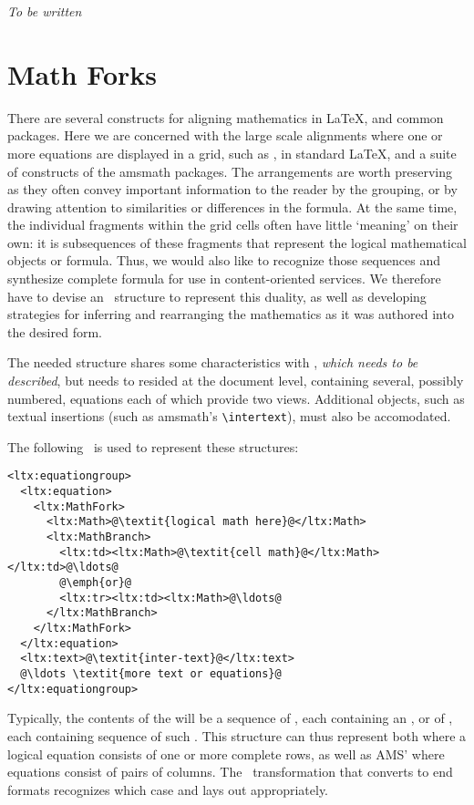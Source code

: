 \documentclass{book}
\begin{document}
\emph{To be written}

\section{Math Forks}\label{mathfork}
There are several constructs for aligning mathematics in \LaTeX, and common
packages. Here we are concerned with the large scale alignments where
one or more equations are displayed in a grid,
such as , in standard \LaTeX,
and a suite of constructs of the amsmath packages.
The arrangements are worth preserving as they often convey important information to the
reader by the grouping, or by drawing attention to similarities or differences
in the formula.   At the same time, the individual fragments within the grid
cells often have little `meaning' on their own:
it is subsequences of these fragments that represent the logical
mathematical objects or formula.  Thus, we would also like to
recognize those sequences and synthesize complete formula
for use in content-oriented services.
We therefore have to devise an \XML\ structure to represent this duality,
as well as developing strategies for inferring and rearranging
the mathematics as it was authored into the desired form.

The needed structure shares some characteristics with ,
\emph{which needs to be described},
but needs to resided at the document level, containing several,
possibly numbered, equations each of which provide two views.
Additional objects, such as textual insertions (such as amsmath's \verb|\intertext|),
must also be accomodated.

The following \XML\ is used to represent these structures:
\begin{lstlisting}[style=xml]
<ltx:equationgroup>
  <ltx:equation>
    <ltx:MathFork>
      <ltx:Math>@\textit{logical math here}@</ltx:Math>
      <ltx:MathBranch>
        <ltx:td><ltx:Math>@\textit{cell math}@</ltx:Math></ltx:td>@\ldots@
        @\emph{or}@
        <ltx:tr><ltx:td><ltx:Math>@\ldots@
      </ltx:MathBranch>
    </ltx:MathFork>
  </ltx:equation>
  <ltx:text>@\textit{inter-text}@</ltx:text>
  @\ldots \textit{more text or equations}@
</ltx:equationgroup>
\end{lstlisting}
Typically, the contents of the  will be a sequence
of , each containing an , or
of , each containing sequence of such .
This structure can thus represent both  where a logical
equation consists of one or more complete rows, as well as
AMS'  where equations consist of pairs of columns.
The \XSLT\ transformation that converts to end formats recognizes
which case and lays out appropriately.
\end{document}

